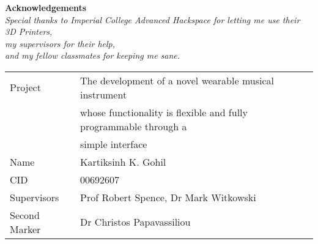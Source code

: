 
\vfill

\begin{center}

\textbf{Acknowledgements}\\
\textit{Special thanks to Imperial College Advanced Hackspace for letting me use their 3D Printers,\\ my supervisors for their help,\\ and my fellow classmates for keeping me sane.}\\

\end{center}
\vspace{40 pt}

\large
\begin{tabular}{|l l}
Project & The development of a novel wearable musical instrument \\
& whose functionality is flexible and fully programmable through a \\ & simple interface \\
Name & Kartiksinh K. Gohil \\
CID & 00692607 \\
Supervisors & Prof Robert Spence, Dr Mark Witkowski \\
Second Marker & Dr Christos Papavassiliou 
\end{tabular}
\normalsize
\newpage